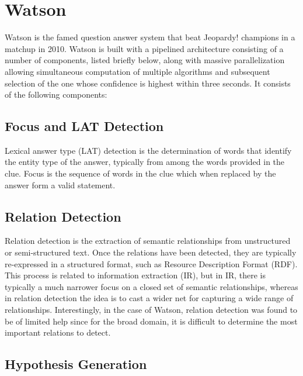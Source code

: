\section{Watson}

Watson \cite{ferrucci2010building} is the famed question answer system that beat Jeopardy! champions in a matchup in 2010.  Watson is built with a pipelined architecture consisting of a number of components, listed briefly below, along with massive parallelization allowing simultaneous computation of multiple algorithms and subsequent selection of the one whose confidence is highest within three seconds.  It consists of the following components:

\subsection{Focus and LAT Detection}

Lexical answer type (LAT) detection is the determination of words that identify the entity type of the answer, typically from among the words provided in the clue.  Focus is the sequence of words in the clue which when replaced by the answer form a valid statement.

\subsection{Relation Detection}

Relation detection is the extraction of semantic relationships from unstructured or semi-structured text.   Once the relations have been detected, they are typically re-expressed in a structured format, such as Resource Description Format (RDF).  This process is related to information extraction (IR), but in IR, there is typically a much narrower focus on a closed set of semantic relationships, whereas in relation detection the idea is to cast a wider net for capturing a wide range of relationships.  Interestingly, in the case of Watson, relation detection was found to be of limited help since for the broad domain, it is difficult to determine the most important relations to detect.

\subsection{Hypothesis Generation}

